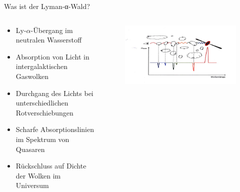   \begin{frame}{Was ist der Lyman-α-Wald?}
    \begin{columns}
   \begin{column}{0.5\textwidth}
    \begin{itemize}
      \setlength\itemsep{2em}
      \item Ly-$\alpha$-Übergang im neutralen Wasserstoff
      \item Absorption von Licht in intergalaktischen Gaswolken
      \item Durchgang des Lichts bei unterschiedlichen Rotverschiebungen
      \item Scharfe Absorptionslinien im Spektrum von Quasaren
      \item Rückschluss auf Dichte der Wolken im Universum
     \end{itemize}
  \vspace{2em}
  \end{column}
  \begin{column}{0.5\textwidth}
  \begin{figure}
    \centering
    \includegraphics[width=\textwidth]{images/lawald.png}
  \end{figure}
  \end{column}
    \end{columns}
  \end{frame}

